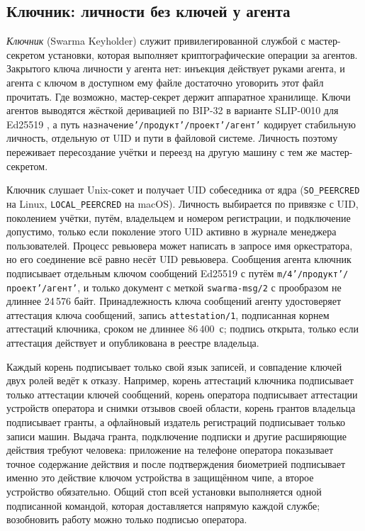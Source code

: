 \documentclass[10pt,a4paper]{article}
\begin{document}
\subsection{Ключник: личности без ключей у агента}
\label{sec:keyholder}

\emph{Ключник} (Swarma Keyholder) служит привилегированной службой с мастер-секретом установки, которая выполняет криптографические операции за агентов. Закрытого ключа личности у агента нет: инъекция действует руками агента, и агента с ключом в доступном ему файле достаточно уговорить этот файл прочитать. Где возможно, мастер-секрет держит аппаратное хранилище. Ключи агентов выводятся жёсткой деривацией по BIP-32 в варианте SLIP-0010 для Ed25519 \cite{bip32,slip10}, а путь \texttt{назначение'/\allowbreak продукт'/\allowbreak проект'/\allowbreak агент'} кодирует стабильную личность, отдельную от UID и пути в файловой системе. Личность поэтому переживает пересоздание учётки и переезд на другую машину с тем же мастер-секретом.

Ключник слушает Unix-сокет и получает UID собеседника от ядра (\texttt{SO\_PEERCRED} на Linux, \texttt{LOCAL\_PEERCRED} на macOS). Личность выбирается по привязке с UID, поколением учётки, путём, владельцем и номером регистрации, и подключение допустимо, только если поколение этого UID активно в журнале менеджера пользователей. Процесс ревьювера может написать в запросе имя оркестратора, но его соединение всё равно несёт UID ревьювера. Сообщения агента ключник подписывает отдельным ключом сообщений Ed25519 с путём \texttt{m/4'/\allowbreak продукт'/\allowbreak проект'/\allowbreak агент'}, и только документ с меткой \texttt{swarma-msg/2} с прообразом не длиннее 24\,576 байт. Принадлежность ключа сообщений агенту удостоверяет аттестация ключа сообщений, запись \texttt{attestation/1}, подписанная корнем аттестаций ключника, сроком не длиннее 86\,400~с; подпись открыта, только если аттестация действует и опубликована в реестре владельца.

Каждый корень подписывает только свой язык записей, и совпадение ключей двух ролей ведёт к отказу. Например, корень аттестаций ключника подписывает только аттестации ключей сообщений, корень оператора подписывает аттестации устройств оператора и снимки отзывов своей области, корень грантов владельца подписывает гранты, а офлайновый издатель регистраций подписывает только записи машин. Выдача гранта, подключение подписки и другие расширяющие действия требуют человека: приложение на телефоне оператора показывает точное содержание действия и после подтверждения биометрией подписывает именно это действие ключом устройства в защищённом чипе, а второе устройство обязательно. Общий стоп всей установки выполняется одной подписанной командой, которая доставляется напрямую каждой службе; возобновить работу можно только подписью оператора.
\end{document}
